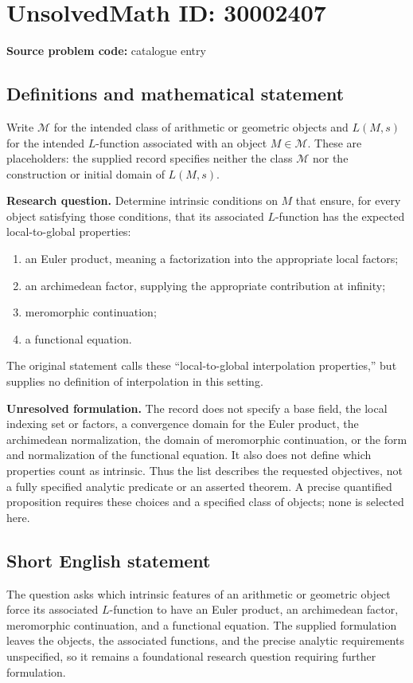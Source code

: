 \documentclass[11pt]{article}
\begin{document}
\section*{UnsolvedMath ID: 30002407}
\textbf{Source problem code:} catalogue entry
\subsection{Definitions and mathematical statement}
Write \(\mathcal M\) for the intended class of arithmetic or geometric objects and \(L(M,s)\) for the intended \(L\)-function associated with an object \(M\in\mathcal M\). These are placeholders: the supplied record specifies neither the class \(\mathcal M\) nor the construction or initial domain of \(L(M,s)\).

\textbf{Research question.} Determine intrinsic conditions on \(M\) that ensure, for every object satisfying those conditions, that its associated \(L\)-function has the expected local-to-global properties:
\begin{enumerate}
\item an Euler product, meaning a factorization into the appropriate local factors;
\item an archimedean factor, supplying the appropriate contribution at infinity;
\item meromorphic continuation;
\item a functional equation.
\end{enumerate}
The original statement calls these ``local-to-global interpolation properties,'' but supplies no definition of interpolation in this setting.

\textbf{Unresolved formulation.} The record does not specify a base field, the local indexing set or factors, a convergence domain for the Euler product, the archimedean normalization, the domain of meromorphic continuation, or the form and normalization of the functional equation. It also does not define which properties count as intrinsic. Thus the list describes the requested objectives, not a fully specified analytic predicate or an asserted theorem. A precise quantified proposition requires these choices and a specified class of objects; none is selected here.
\subsection{Short English statement}
The question asks which intrinsic features of an arithmetic or geometric object force its associated \(L\)-function to have an Euler product, an archimedean factor, meromorphic continuation, and a functional equation. The supplied formulation leaves the objects, the associated functions, and the precise analytic requirements unspecified, so it remains a foundational research question requiring further formulation.
\end{document}
